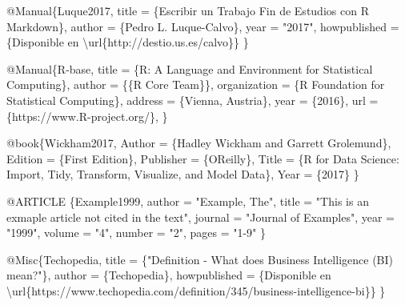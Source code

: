 \documentclass[12pt,a4paper,]{book}
\newenvironment{Shaded}{\begin{snugshade}}{\end{snugshade}}
\newcommand{\CharTok}[1]{\textcolor[rgb]{0.31,0.60,0.02}{#1}}
\newcommand{\DataTypeTok}[1]{\textcolor[rgb]{0.13,0.29,0.53}{#1}}
\newcommand{\NormalTok}[1]{#1}
\newcommand{\OtherTok}[1]{\textcolor[rgb]{0.56,0.35,0.01}{#1}}
\newcommand{\StringTok}[1]{\textcolor[rgb]{0.31,0.60,0.02}{#1}}
\newcommand{\VariableTok}[1]{\textcolor[rgb]{0.00,0.00,0.00}{#1}}
\numberwithin{dummy}{section}
\theoremstyle{ocrenumbox}
\theoremstyle{blacknumex}
\theoremstyle{blacknumbox}
\theoremstyle{ocrenum}
\theoremstyle{ocrenum}
\begin{document}
\begin{Shaded}
\begin{Highlighting}[]
\VariableTok{@Manual}\NormalTok{\{}\OtherTok{Luque2017}\NormalTok{,}
  \DataTypeTok{title}\NormalTok{ = \{Escribir un Trabajo Fin de Estudios con R Markdown\},}
  \DataTypeTok{author}\NormalTok{ = \{Pedro L. Luque{-}Calvo\},}
  \DataTypeTok{year}\NormalTok{ = "}\StringTok{2017}\NormalTok{",}
  \DataTypeTok{howpublished}\NormalTok{ = \{Disponible en }\CharTok{\textbackslash{}url}\NormalTok{\{http://destio.us.es/calvo\}\}}
\NormalTok{\}}

\VariableTok{@Manual}\NormalTok{\{}\OtherTok{R}\NormalTok{{-}}\OtherTok{base}\NormalTok{,}
  \DataTypeTok{title}\NormalTok{ = \{R: A Language and Environment for Statistical}
\NormalTok{    Computing\},}
  \DataTypeTok{author}\NormalTok{ = \{\{R Core Team\}\},}
  \DataTypeTok{organization}\NormalTok{ = \{R Foundation for Statistical Computing\},}
  \DataTypeTok{address}\NormalTok{ = \{Vienna, Austria\},}
  \DataTypeTok{year}\NormalTok{ = \{2016\},}
  \DataTypeTok{url}\NormalTok{ = \{https://www.R{-}project.org/\},}
\NormalTok{\}}


\VariableTok{@book}\NormalTok{\{}\OtherTok{Wickham2017}\NormalTok{,}
    \DataTypeTok{Author}\NormalTok{ = \{Hadley Wickham and Garrett Grolemund\},}
    \DataTypeTok{Edition}\NormalTok{ = \{First Edition\},}
    \DataTypeTok{Publisher}\NormalTok{ = \{O\textquotesingle{}Reilly\},}
    \DataTypeTok{Title}\NormalTok{ = \{R for Data Science: Import, Tidy, Transform, }
\NormalTok{    Visualize, and Model Data\},}
    \DataTypeTok{Year}\NormalTok{ = \{2017\}}
\NormalTok{\}}

\VariableTok{@ARTICLE}\NormalTok{ \{}\OtherTok{Example1999}\NormalTok{,}
    \DataTypeTok{author}\NormalTok{  = "}\StringTok{Example, The}\NormalTok{",}
    \DataTypeTok{title}\NormalTok{   = "}\StringTok{This is an exmaple article not cited in the text}\NormalTok{",}
    \DataTypeTok{journal}\NormalTok{ = "}\StringTok{Journal of Examples}\NormalTok{",}
    \DataTypeTok{year}\NormalTok{    = "}\StringTok{1999}\NormalTok{",}
    \DataTypeTok{volume}\NormalTok{  = "}\StringTok{4}\NormalTok{",}
    \DataTypeTok{number}\NormalTok{  = "}\StringTok{2}\NormalTok{",}
    \DataTypeTok{pages}\NormalTok{   = "}\StringTok{1{-}9}\NormalTok{"}
\NormalTok{\}}

\VariableTok{@Misc}\NormalTok{\{}\OtherTok{Techopedia}\NormalTok{,}
  \DataTypeTok{title}\NormalTok{ = \{"Definition {-} What does Business Intelligence (BI) mean?"\},}
  \DataTypeTok{author}\NormalTok{ = \{Techopedia\},}
  \DataTypeTok{howpublished}\NormalTok{ = \{Disponible en}
  \CharTok{\textbackslash{}url}\NormalTok{\{https://www.techopedia.com/definition/345/business{-}intelligence{-}bi\}\}}
\NormalTok{\}}

\end{Highlighting}
\end{Shaded}
\end{document}
